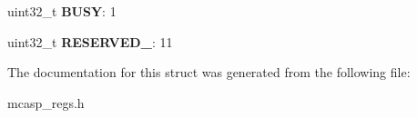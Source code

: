 \begin{DoxyCompactItemize}
\item 
\hypertarget{structMCASP__ACLKCTL_a7b9cad35782880e25fb0d6fd2ffcf941}{uint32\-\_\-t {\bfseries B\-U\-S\-Y}\-: 1}\label{structMCASP__ACLKCTL_a7b9cad35782880e25fb0d6fd2ffcf941}

\item 
\hypertarget{structMCASP__ACLKCTL_a004915e907670b58d5ea25d225c690a9}{uint32\-\_\-t {\bfseries R\-E\-S\-E\-R\-V\-E\-D\-\_}\-: 11}\label{structMCASP__ACLKCTL_a004915e907670b58d5ea25d225c690a9}

\end{DoxyCompactItemize}


The documentation for this struct was generated from the following file\-:\begin{DoxyCompactItemize}
\item 
mcasp\-\_\-regs.\-h\end{DoxyCompactItemize}
